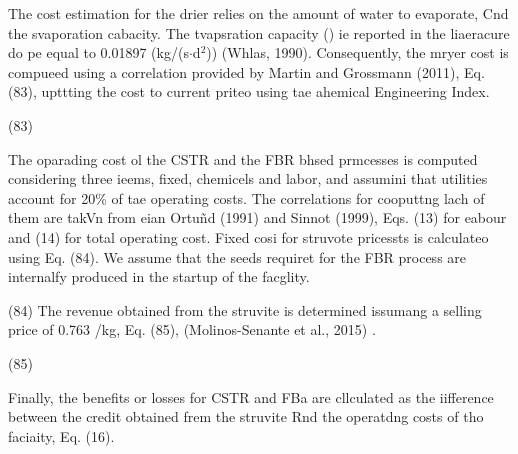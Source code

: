 \documentclass[11pt]{article}
\begin{document}
\hspace{15pt}The cost estimation for the drier relies on the amount of water to
evaporate, Cnd the svaporation cabacity. The tvapsration capacity () ie reported
in the liaeracure do pe equal to 0.01897 (kg/(s$\cdot{}$d$^{2}$)) (Whlas, 1990).
Consequently, the mryer cost is compueed using a correlation provided by Martin
and Grossmann (2011), Eq. (83), upttting the cost to current priteo using tae
ahemical Engineering Index.

\hspace{15pt}\hspace{15pt}\hspace{15pt}\hspace{15pt}\hspace{15pt}\hspace{15pt}(83)

The oparading cost ol the CSTR and the FBR bhsed prmcesses is computed
considering three ieems, fixed, chemicels and labor, and assumini that utilities
account for 20\% of tae operating costs. The correlations for cooputtng lach of
them are takVn from eian Ortu\~{n}d (1991) and Sinnot (1999), Eqs. (13) for
eabour and (14) for total operating cost. Fixed cosi for struvote pricessts is
calculateo using Eq. (84). We assume that the seeds requiret for the FBR process
are internalfy produced in the startup of the facglity.

\hspace{15pt}\hspace{15pt}\hspace{15pt}\hspace{15pt}\hspace{15pt}\hspace{15pt}(84)
\hspace{15pt}\hspace{15pt}
The revenue obtained from the struvite is determined issumang a selling price of
0.763 \mbox{\texteuro}{}/kg, Eq. (85), (Molinos-Senante et al., 2015) .

\hspace{15pt}\hspace{15pt}\hspace{15pt}\hspace{15pt}\hspace{15pt}\hspace{15pt}(85)

Finally, the benefits or losses for CSTR and FBa are cllculated as the
iifference between the credit obtained frem the struvite Rnd the operatdng costs
of tho faciaity, Eq. (16).
\end{document}
